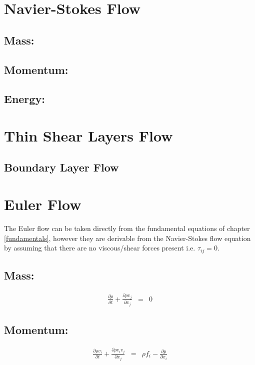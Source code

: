 \newpage
\section{Navier-Stokes Flow}

\subsection*{Mass:}

\subsection*{Momentum:}

\subsection*{Energy:}







\newpage
\section{Thin Shear Layers Flow}

\subsection{Boundary Layer Flow}








\newpage
\section{Euler Flow}
The Euler flow can be taken directly from the fundamental equations of chapter \ref{fundamentals}, however they are derivable from the Navier-Stokes flow equation by assuming that there are no viscous/shear forces present i.e. $\tau_{ij}=0$.
\subsection*{Mass:}
\begin{eqnarray}
    \frac{\partial \rho}{\partial t} +  \frac{\partial \rho v_j}{\partial x_j} &=& 0
\end{eqnarray}

\subsection*{Momentum:}
\begin{eqnarray}
    \frac{\partial \rho v_i}{\partial t} +  \frac{\partial \rho v_i v_j}{\partial x_j} &=& \rho f_i - \frac{\partial p}{\partial x_i}
\end{eqnarray}

